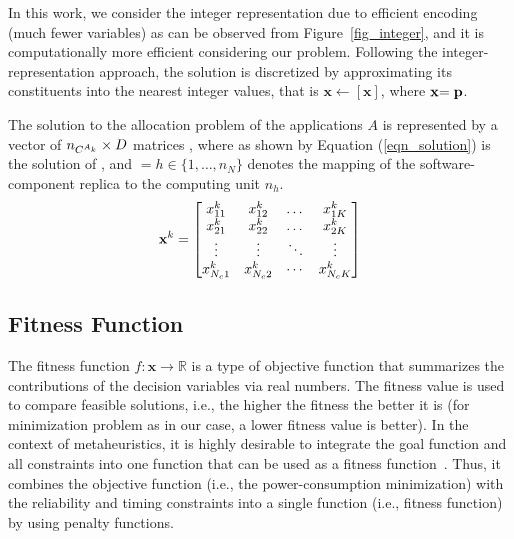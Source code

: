 In this work, we consider the integer representation due to efficient encoding (much fewer variables) as can be observed from Figure~\ref{fig_integer}, and  it is computationally more efficient considering our problem. Following the integer-representation approach, the solution is discretized by approximating its constituents into the nearest integer values, that is $\textbf{x}\leftarrow [\textbf{x}]$, where $\ttx=\textbf{p}$.

The solution to the allocation problem of the applications $A$ is represented by a vector of $\ssb{n}[\ssp{C}]\times D$ matrices , where  as shown by Equation (\ref{eqn_solution}) is the solution of \ttar, and $=h\in \{1,…,n_N\}$ denotes the mapping of the  software-component replica  to the computing unit $n_h$.
\begin{equation}
\label{eqn_solution}
\textbf{x}^{k}=
\begin{bmatrix} 
x^{k}_{11} & x^{k}_{12} & \dots & x^{k}_{1K}\\
x^{k}_{21} & x^{k}_{22} & \dots & x^{k}_{2K}\\
\vdots & \vdots & \ddots & \vdots\\
x^{k}_{N_c1} & x^{k}_{N_c2} & \cdots & x^{k}_{N_cK}
\end{bmatrix}
\end{equation}

\subsection{Fitness Function}
The fitness function $f:\textbf{x}\rightarrow \mathbb{R}$ is a type of objective function that summarizes the contributions of the decision variables via real numbers. The fitness value is used to compare feasible solutions, i.e., the higher the fitness the better it is (for minimization problem as in our case, a lower fitness value is better). In the context of metaheuristics, it is highly desirable to integrate the goal function and all constraints into one function that can be used as a fitness function~\cite{Talbi2009Metaheuristics:Implementation,faragardi2018AECUs}. Thus, it combines the objective function (i.e., the power-consumption minimization) with the reliability and timing constraints into a single function (i.e., fitness function) by using penalty functions. 


